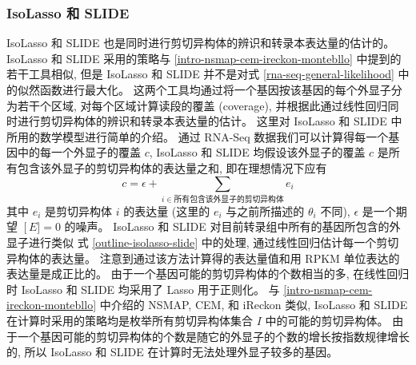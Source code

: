 \subsubsection{IsoLasso 和 SLIDE}
IsoLasso 和 SLIDE 也是同时进行剪切异构体的辨识和转录本表达量的估计的。 
IsoLasso 和 SLIDE 采用的策略与 \ref{intro-nsmap-cem-ireckon-montebllo} 
中提到的若干工具相似, 但是 IsoLasso 和 SLIDE 并不是对式 
\eqref{rna-seq-general-likelihood} 中的似然函数进行最大化。 
这两个工具均通过将一个基因按该基因的每个外显子分为若干个区域, 
对每个区域计算读段的覆盖 (coverage), 
并根据此通过线性回归同时进行剪切异构体的辨识和转录本表达量的估计。 
这里对 IsoLasso 和 SLIDE 中所用的数学模型进行简单的介绍。 
通过 RNA-Seq 数据我们可以计算得每一个基因中的每一个外显子的覆盖 $c$, 
IsoLasso 和 SLIDE 均假设该外显子的覆盖 $c$ 是所有包含该外显子的剪切异构体的表达量之和, 
即在理想情况下应有
\begin{equation}
\label{outline-isolasso-slide}
c = \epsilon + \sum_{i \in \text{所有包含该外显子的剪切异构体}} e_i
\end{equation}
其中 $e_i$ 是剪切异构体 $i$ 的表达量 (这里的 $e_i$ 与之前所描述的 $\theta_i$ 不同), 
$\epsilon$ 是一个期望 $\operatorname[E] = 0$ 的噪声。 
IsoLasso 和 SLIDE 对目前转录组中所有的基因所包含的外显子进行类似 
式 \eqref{outline-isolasso-slide} 中的处理, 通过线性回归估计每一个剪切异构体的表达量。 
注意到通过该方法计算得的表达量值和用 RPKM 单位表达的表达量是成正比的。 
由于一个基因可能的剪切异构体的个数相当的多, 
在线性回归时 IsoLasso 和 SLIDE 均采用了 Lasso \cite{tibshirani1996regression} 用于正则化。 
与 \ref{intro-nsmap-cem-ireckon-montebllo} 中介绍的 NSMAP, CEM, 和 iReckon 类似, 
IsoLasso 和 SLIDE 在计算时采用的策略均是枚举所有剪切异构体集合 $I$ 中的可能的剪切异构体。 
由于一个基因可能的剪切异构体的个数是随它的外显子的个数的增长按指数规律增长的, 
所以 IsoLasso 和 SLIDE 在计算时无法处理外显子较多的基因。 











